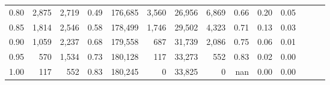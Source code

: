 \begin{tabular}{rrrrrrrrrrrrrr}
0.80 &   2,875 &  2,719 &  0.49 &  176,685 &    3,560 &  26,956 &   6,869 &  0.66 &  0.20 &      0.05 \\
0.85 &   1,814 &  2,546 &  0.58 &  178,499 &    1,746 &  29,502 &   4,323 &  0.71 &  0.13 &      0.03 \\
0.90 &   1,059 &  2,237 &  0.68 &  179,558 &      687 &  31,739 &   2,086 &  0.75 &  0.06 &      0.01 \\
0.95 &     570 &  1,534 &  0.73 &  180,128 &      117 &  33,273 &     552 &  0.83 &  0.02 &      0.00 \\
1.00 &     117 &    552 &  0.83 &  180,245 &        0 &  33,825 &       0 &   nan &  0.00 &      0.00 \\
\bottomrule
\end{tabular}

